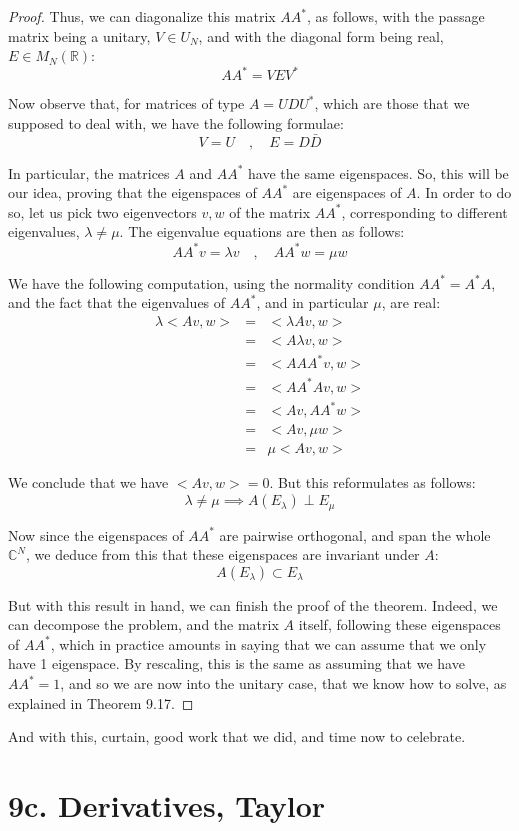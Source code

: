 \documentclass[12pt]{amsbook}
\begin{document}
\begin{proof}
Thus, we can diagonalize this matrix $AA^*$, as follows, with the passage matrix being a unitary, $V\in U_N$, and with the diagonal form being real, $E\in M_N(\mathbb R)$:
$$AA^*=VEV^*$$

Now observe that, for matrices of type $A=UDU^*$, which are those that we supposed to deal with, we have the following formulae:
$$V=U\quad,\quad 
E=D\bar{D}$$

In particular, the matrices $A$ and $AA^*$ have the same eigenspaces. So, this will be our idea, proving that the eigenspaces of $AA^*$ are eigenspaces of $A$. In order to do so, let us pick two eigenvectors $v,w$ of the matrix $AA^*$, corresponding to different eigenvalues, $\lambda\neq\mu$. The eigenvalue equations are then as follows:
$$AA^*v=\lambda v\quad,\quad 
AA^*w=\mu w$$

We have the following computation, using the normality condition $AA^*=A^*A$, and the fact that the eigenvalues of $AA^*$, and in particular $\mu$, are real:
\begin{eqnarray*}
\lambda<Av,w>
&=&<\lambda Av,w>\\
&=&<A\lambda v,w>\\
&=&<AAA^*v,w>\\
&=&<AA^*Av,w>\\
&=&<Av,AA^*w>\\
&=&<Av,\mu w>\\
&=&\mu<Av,w>
\end{eqnarray*}

We conclude that we have $<Av,w>=0$. But this reformulates as follows:
$$\lambda\neq\mu\implies A(E_\lambda)\perp E_\mu$$

Now since the eigenspaces of $AA^*$ are pairwise orthogonal, and span the whole $\mathbb C^N$, we deduce from this that these eigenspaces are invariant under $A$:
$$A(E_\lambda)\subset E_\lambda$$

But with this result in hand, we can finish the proof of the theorem. Indeed, we can decompose the problem, and the matrix $A$ itself, following these eigenspaces of $AA^*$, which in practice amounts in saying that we can assume that we only have 1 eigenspace. By rescaling, this is the same as assuming that we have $AA^*=1$, and so we are now into the unitary case, that we know how to solve, as explained in Theorem 9.17.
\end{proof}

And with this, curtain, good work that we did, and time now to celebrate.

\section*{9c. Derivatives, Taylor}
\end{document}
